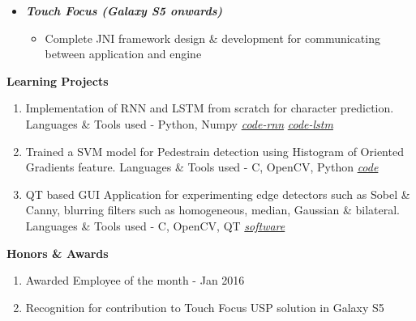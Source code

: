 \documentclass[letterpaper,11pt]{article}
\def\CC{{C\nolinebreak[4]\hspace{-.05em}\raisebox{.4ex}{\tiny\bf ++}}}
\newcommand{\resitem}[1]{\item #1 \vspace{-2pt}}
\newcommand{\resheading}[1]{{\large \colorbox{mygrey}{\begin{minipage}{\textwidth}{\textbf{#1 \vphantom{p\^{E}}}}\end{minipage}}}}
\begin{document}
\begin{itemize}
\begin{itemize}
\begin{itemize}
						\resitem{Developed red eye correction algorithm. GUI developed using Matlab GUIDE for quick demo }
						\resitem{Implemented image blur detection and ranking algorithms}
						\resitem{Implemented bilinear resizer module for less memory architecture in Photo Editor}
						\resitem{Optimization of Photo Editor effects using POSIX threads}
						\resitem{Languages \& Tools used - C, \CC, MATLAB}
				\end{itemize}
				\vspace{2.5mm}
				\resitem[]{\faCircleO \hspace{1mm}\textbf{\emph{Touch Focus (Galaxy S5 onwards)}}}
				\begin{itemize}
						\resitem{Complete JNI framework design \& development for communicating between application and engine}
				\end{itemize}
		\end{itemize}

\end{itemize}

\resheading{Learning Projects}
\begin{enumerate}
	\item Implementation of RNN and LSTM from scratch for character prediction. Languages \& Tools used - Python, Numpy
		\faGithub \hspace{1mm}\href{https://github.com/nrupatunga/char-rnn}{\emph{code-rnn}}
		\faGithub \hspace{1mm}\href{https://github.com/nrupatunga/multi-layer-lstm}{\emph{code-lstm}}
	\item Trained a SVM model for Pedestrain detection using Histogram of Oriented Gradients feature. Languages \& Tools used - \CC, OpenCV, Python
		\faGithub \hspace{1mm}\href{https://github.com/nrupatunga/Pedestrain-Detection-using-Histogram-of-Oriented-Gradients}{\emph{code}}
	\item QT based GUI Application for experimenting edge detectors such as Sobel \& Canny, blurring filters such as homogeneous, median, Gaussian \& bilateral.
		Languages \& Tools used - \CC, OpenCV, QT
		\faWindows \hspace{1mm}\href{https://github.com/nrupatunga/Computer-Vision-Tool}{\emph{software}}
\end{enumerate}

\resheading{Honors \& Awards}
\begin{enumerate}
	\item Awarded Employee of the month - Jan 2016
	\item Recognition for contribution to Touch Focus USP solution in Galaxy S5
\end{enumerate}
\end{document}

